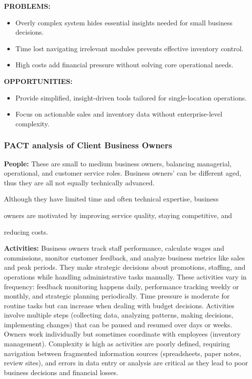 \documentclass[]{VUMIFTemplateClass}
\begin{document}
\textbf{PROBLEMS:}
\begin{itemize}
    \item Overly complex system hides essential insights needed for small business decisions.
    \item Time lost navigating irrelevant modules prevents effective inventory control.
    \item High costs add financial pressure without solving core operational needs.
\end{itemize}

\textbf{OPPORTUNITIES:}
\begin{itemize}
    \item Provide simplified, insight-driven tools tailored for single-location operations.
    \item Focus on actionable sales and inventory data without enterprise-level complexity.
\end{itemize}

\subsubsection{PACT analysis of Client Business Owners}
    \textbf{People:} These are small to medium business owners, balancing
    managerial, operational, and customer service roles. Business owners’ can be
    different aged, thus they are all not equally technically advanced.

Although they have limited time and often technical expertise, business

owners are motivated by improving service quality, staying competitive, and

reducing costs.

\textbf{Activities:} Business owners track staff performance, calculate wages
and commissions, monitor customer feedback, and analyze business metrics like
sales and peak periods. They make strategic decisions about promotions,
staffing, and operations while handling administrative tasks manually. These
activities vary in frequency: feedback monitoring happens daily, performance
tracking weekly or monthly, and strategic planning periodically. Time pressure
is moderate for routine tasks but can increase when dealing with budget
decisions. Activities involve multiple steps (collecting data, analyzing
patterns, making decisions, implementing changes) that can be paused and resumed
over days or weeks. Owners work individually but sometimes coordinate with
employees (inventory management). Complexity is high as activities are poorly
defined, requiring navigation between fragmented information sources
(spreadsheets, paper notes, review sites), and errors in data entry or analysis
are critical as they lead to poor business decisions and financial losses.
\end{document}
